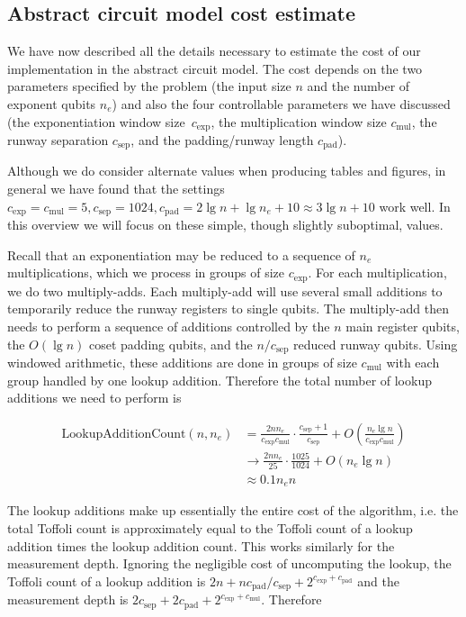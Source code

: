\documentclass[superscriptaddress,notitlepage,longbibliography]{revtex4-1}
\theoremstyle{definition}
\theoremstyle{definition}
\newcommand{\lenexp}{{n_e}}
\newcommand{\gexp}{{c_{\text{exp}}}}
\newcommand{\gmul}{{c_{\text{mul}}}}
\newcommand{\gsep}{{c_{\text{sep}}}}
\newcommand{\gpad}{{c_{\text{pad}}}}
\begin{document}
\subsection{Abstract circuit model cost estimate}

We have now described all the details necessary to estimate the cost of our implementation in the abstract circuit model.
The cost depends on the two parameters specified by the problem (the input size $n$ and the number of exponent qubits $\lenexp$) and also the four controllable parameters we have discussed (the exponentiation window size~$\gexp$, the multiplication window size $\gmul$, the runway separation $\gsep$, and the padding/runway length $\gpad$).

Although we do consider alternate values when producing tables and figures, in general we have found that the settings $\gexp=\gmul=5, \gsep=1024, \gpad=2 \lg n + \lg \lenexp + 10 \approx 3 \lg n + 10$ work well.
In this overview we will focus on these simple, though slightly suboptimal, values.

Recall that an exponentiation may be reduced to a sequence of $\lenexp$ multiplications, which we process in groups of size $\gexp$.
For each multiplication, we do two multiply-adds.
Each multiply-add will use several small additions to temporarily reduce the runway registers to single qubits.
The multiply-add then needs to perform a sequence of additions controlled by the $n$ main register qubits, the $O(\lg n)$ coset padding qubits, and the $n/\gsep$ reduced runway qubits.
Using windowed arithmetic, these additions are done in groups of size $\gmul$ with each group handled by one lookup addition.
Therefore the total number of lookup additions we need to perform is

\begin{equation}
\begin{aligned}
    \text{LookupAdditionCount}(n, \lenexp)
    &= \frac{2 n \lenexp}{\gexp \gmul} \cdot \frac{\gsep + 1}{\gsep} + O\left( \frac{\lenexp \lg n}{\gexp \gmul} \right)
    \\&\rightarrow \frac{2 n \lenexp}{25} \cdot \frac{1025}{1024} + O\left(\lenexp \lg n\right)
    \\&\approx 0.1 \lenexp n
\end{aligned}
\end{equation}

The lookup additions make up essentially the entire cost of the algorithm, i.e.
the total Toffoli count is approximately equal to the Toffoli count of a lookup addition times the lookup addition count.
This works similarly for the measurement depth.
Ignoring the negligible cost of uncomputing the lookup, the Toffoli count of a lookup addition is $2n + n \gpad / \gsep + 2^{\gexp + \gpad}$ and the measurement depth is $2 \gsep + 2 \gpad + 2^{\gexp + \gmul}$.
Therefore
\end{document}
